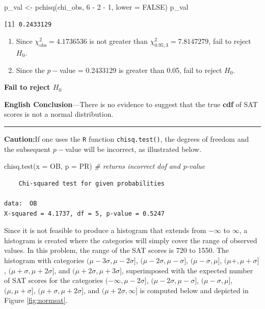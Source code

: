 \documentclass[
]{article}
\newenvironment{Shaded}{\begin{snugshade}}{\end{snugshade}}
\newcommand{\AttributeTok}[1]{\textcolor[rgb]{0.77,0.63,0.00}{#1}}
\newcommand{\CommentTok}[1]{\textcolor[rgb]{0.56,0.35,0.01}{\textit{#1}}}
\newcommand{\ConstantTok}[1]{\textcolor[rgb]{0.00,0.00,0.00}{#1}}
\newcommand{\DecValTok}[1]{\textcolor[rgb]{0.00,0.00,0.81}{#1}}
\newcommand{\FunctionTok}[1]{\textcolor[rgb]{0.00,0.00,0.00}{#1}}
\newcommand{\NormalTok}[1]{#1}
\newcommand{\OtherTok}[1]{\textcolor[rgb]{0.56,0.35,0.01}{#1}}
\newcommand{\SpecialCharTok}[1]{\textcolor[rgb]{0.00,0.00,0.00}{#1}}
\begin{document}
\begin{Shaded}
\begin{Highlighting}[]
\NormalTok{p\_val }\OtherTok{\textless{}{-}} \FunctionTok{pchisq}\NormalTok{(chi\_obs, }\DecValTok{6} \SpecialCharTok{{-}} \DecValTok{2} \SpecialCharTok{{-}} \DecValTok{1}\NormalTok{, }\AttributeTok{lower =} \ConstantTok{FALSE}\NormalTok{)}
\NormalTok{p\_val}
\end{Highlighting}
\end{Shaded}

\begin{verbatim}
[1] 0.2433129
\end{verbatim}

\begin{enumerate}
\def\labelenumi{\Roman{enumi}.}
\item
  Since \(\chi^2_{\text{obs}}=4.1736536\) is not greater than \(\chi^2_{0.95;3}=7.8147279\), fail to reject \(H_0\).
\item
  Since the \(p-\)value = 0.2433129 is greater than 0.05, fail to reject \(H_0\).
\end{enumerate}

\textbf{Fail to reject \(H_0\)}

\textbf{English Conclusion}---There is no evidence to suggest that the true \textbf{cdf} of SAT scores is not a normal distribution.

\begin{center}\rule{0.5\linewidth}{0.5pt}\end{center}

\textbf{Caution:}If one uses the \texttt{R} function \texttt{chisq.test()}, the degrees of
freedom and the subsequent \(p-\)value will be incorrect, as illustrated
below.

\begin{Shaded}
\begin{Highlighting}[]
\FunctionTok{chisq.test}\NormalTok{(}\AttributeTok{x =}\NormalTok{ OB, }\AttributeTok{p =}\NormalTok{ PR)  }\CommentTok{\# returns incorrect dof and p{-}value}
\end{Highlighting}
\end{Shaded}

\begin{verbatim}
    Chi-squared test for given probabilities

data:  OB
X-squared = 4.1737, df = 5, p-value = 0.5247
\end{verbatim}

Since it is not feasible to produce a histogram that extends from \(-\infty\) to \(\infty\), a histogram is created where the categories will simply cover the range of observed values. In this problem, the range of the SAT scores is 720 to 1550. The histogram with categories \((\mu-3\sigma, \mu-2\sigma]\), \((\mu-2\sigma, \mu-\sigma]\), \((\mu-\sigma, \mu]\), \((\mu+, \mu+\sigma]\), \((\mu+\sigma, \mu+2\sigma]\), and \((\mu+2\sigma, \mu+3\sigma]\), superimposed with the expected number of SAT scores for the categories \((-\infty, \mu-2\sigma]\), \((\mu-2\sigma, \mu-\sigma]\), \((\mu-\sigma, \mu]\), \((\mu, \mu+\sigma]\), \((\mu+\sigma, \mu+2\sigma]\), and \((\mu+2\sigma, \infty]\) is computed below and depicted in Figure \ref{fig:normsat}.
\end{document}
